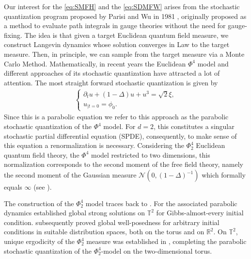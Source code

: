 Our interest for the \eqref{eq:SMFH} and the \eqref{eq:SDMFW} arises from the stochastic quantization program proposed by Parisi and Wu in 1981 \cite{Parisi1981}, originally proposed as a method to evaluate path integrals in gauge theories without the need for gauge-fixing. The idea is that given a target Euclidean quantum field measure, we construct Langevin dynamics whose solution converges in Law to the target measure. Then, in principle, we can sample from the target measure via a Monte Carlo Method. 
Mathematically, in recent years the Euclidean $\Phi^4$ model and different approaches of its stochastic quantization have attracted a lot of attention. 
The most straight forward stochastic quantization is given by 
\begin{align}\label{eq:SNLH_unrenormalized}
\begin{cases}
 \partial_t u + (1 - \Delta) u + u^3  = \sqrt{2}\xi,    \\
u_{| t=0} =\phi _0.
\end{cases}
\end{align}
Since this is a parabolic equation we refer to this approach as the parabolic stochastic quantization of the $\Phi^4$ model. 
For $d = 2$, this constitutes a singular stochastic partial differential equation (SPDE), consequently, to make sense of this equation a renormalization is necessary. Considering the $\Phi^4_2$ Euclidean quantum field theory, the $\Phi^4$ model restricted to two dimensions, this normalization corresponds to the second moment of the free field theory, namely the second moment of the Gaussian measure $\mathcal{N}(0, (1-\Delta)^{-1})$ which formally equals $\infty$ (see \cite{GlimmJaffe1987}). 

The construction of the $\Phi^4_2$ model traces back to \cite{GlimmJaffe1987}. For the associated parabolic dynamics \cite{DaPratoDebussche2003} established global strong solutions on $\mathbb{T}^2$ for Gibbs-almost-every initial condition. \cite{MourratWeber2017Plane} subsequently proved global well-posedness for arbitrary initial conditions in suitable distribution spaces, both on the torus and on $\mathbb{R}^2$. On $\mathbb{T}^2$, unique ergodicity of the $\Phi^4_2$ measure was established in \cite{TsatsoulisWeber2018}, completing the parabolic stochastic quantization of the $\Phi^4_2$-model on the two-dimensional torus. 


